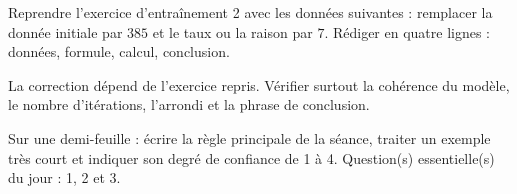
\begin{homework}Reprendre l'exercice d'entraînement 2 avec les données suivantes : remplacer la donnée initiale par $385$ et le taux ou la raison par $7$. Rédiger en quatre lignes : données, formule, calcul, conclusion.\end{homework}
\begin{solution}La correction dépend de l'exercice repris. Vérifier surtout la cohérence du modèle, le nombre d'itérations, l'arrondi et la phrase de conclusion.\end{solution}

\begin{exitticket}[3 minutes]Sur une demi-feuille : écrire la règle principale de la séance, traiter un exemple très court et indiquer son degré de confiance de 1 à 4. Question(s) essentielle(s) du jour : 1, 2 et 3.\end{exitticket}

